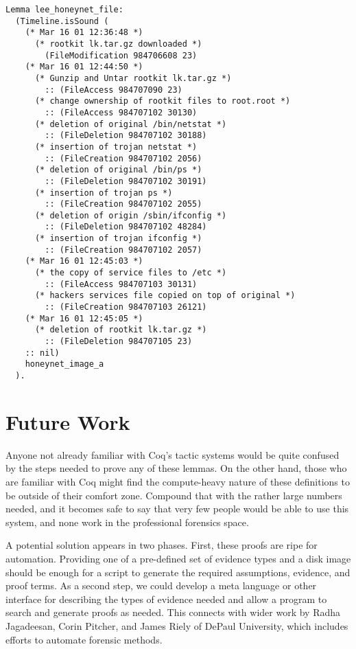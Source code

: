 \documentclass[nocopyrightspace]{sigplanconf}
\begin{document}
\begin{lstlisting}
Lemma lee_honeynet_file:
  (Timeline.isSound (
    (* Mar 16 01 12:36:48 *)
      (* rootkit lk.tar.gz downloaded *)
        (FileModification 984706608 23)
    (* Mar 16 01 12:44:50 *)
      (* Gunzip and Untar rootkit lk.tar.gz *)
        :: (FileAccess 984707090 23)
      (* change ownership of rootkit files to root.root *)
        :: (FileAccess 984707102 30130)
      (* deletion of original /bin/netstat *)
        :: (FileDeletion 984707102 30188)
      (* insertion of trojan netstat *)
        :: (FileCreation 984707102 2056) 
      (* deletion of original /bin/ps *)
        :: (FileDeletion 984707102 30191)
      (* insertion of trojan ps *)
        :: (FileCreation 984707102 2055) 
      (* deletion of origin /sbin/ifconfig *)
        :: (FileDeletion 984707102 48284)
      (* insertion of trojan ifconfig *)
        :: (FileCreation 984707102 2057) 
    (* Mar 16 01 12:45:03 *)
      (* the copy of service files to /etc *)
        :: (FileAccess 984707103 30131)  
      (* hackers services file copied on top of original *)
        :: (FileCreation 984707103 26121)
    (* Mar 16 01 12:45:05 *)
      (* deletion of rootkit lk.tar.gz *)
        :: (FileDeletion 984707105 23)   
    :: nil)
    honeynet_image_a
  ).
\end{lstlisting}

\section{Future Work}
Anyone not already familiar with Coq's tactic systems would be quite confused
by the steps needed to prove any of these lemmas. On the other hand, those who
are familiar with Coq might find the compute-heavy nature of these definitions
to be outside of their comfort zone. Compound that with the rather large
numbers needed, and it becomes safe to say that very few people would be able
to use this system, and none work in the professional forensics space.

A potential solution appears in two phases. First, these proofs are ripe for
automation. Providing one of a pre-defined set of evidence types and a disk
image should be enough for a script to generate the required assumptions,
evidence, and proof terms. As a second step, we could develop a meta language
or other interface for describing the types of evidence needed and allow a
program to search and generate proofs as needed. This connects with wider work
by Radha Jagadeesan, Corin Pitcher, and James Riely of DePaul University,
which includes efforts to automate forensic methods.
\end{document}
